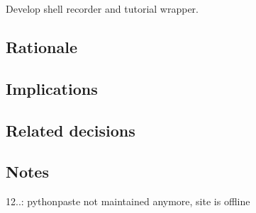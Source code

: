Develop shell recorder and tutorial wrapper.

\subsection*{Rationale}

\subsection*{Implications}

\subsection*{Related decisions}

\subsection*{Notes}


\begin{DoxyItemize}
\item 12..\+: pythonpaste not maintained anymore, site is offline 
\end{DoxyItemize}